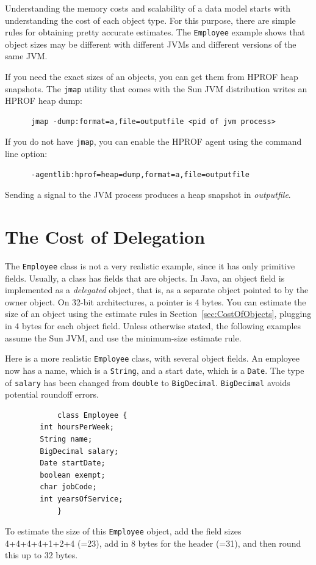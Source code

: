 Understanding the memory costs and scalability of a data model starts with understanding the cost of each object type. For this purpose, there are simple rules for obtaining pretty accurate estimates. The \texttt{Employee} example shows that object sizes may be different with different JVMs and different versions of the same JVM.

If you need the exact sizes of an objects, you can get them from HPROF heap snapshots. The \texttt{jmap} utility that comes with the Sun JVM distribution writes an HPROF heap dump:
\ttfamily
\begin{verbatim} 
      jmap -dump:format=a,file=outputfile <pid of jvm process> 
\end{verbatim}
If you do not have \texttt{jmap}, you can enable the HPROF agent using the command line option: 
\ttfamily
\begin{verbatim} 
      -agentlib:hprof=heap=dump,format=a,file=outputfile
\end{verbatim}
\normalfont
Sending a signal to the JVM process produces a heap snapshot in \textit{outputfile}.


\section{The Cost of Delegation}

The \texttt{Employee} class is not a very realistic example, since it has only primitive fields. Usually, a class has fields that are objects.  In Java, an object field is implemented as a \textit{delegated} object, that is, as a separate object pointed to by the owner object. On 32-bit architectures, a pointer is 4 bytes. You can estimate the size of an object using the estimate rules in Section~\ref{sec:CostOfObjects}, plugging in 4 bytes for each object field. Unless otherwise stated, the following examples assume the Sun JVM, and use the minimum-size estimate rule. 
\begin{example}
Here is a more realistic \texttt{Employee} class, with several object fields. An employee now has a name, which is a \texttt{String}, and a start date, which is a \texttt{Date}. The type of \texttt{salary} has been changed from \texttt{double} to \texttt{BigDecimal}. \texttt{BigDecimal} avoids potential roundoff errors.
\ttfamily
\begin{verbatim} 
			class Employee {
        int hoursPerWeek;
        String name;
        BigDecimal salary;
        Date startDate;
        boolean exempt;
        char jobCode;
        int yearsOfService;
			}
\end{verbatim}
\normalfont
To estimate the size of this \texttt{Employee} object, add the field sizes 4+4+4+4+1+2+4 (=23), add in 8 bytes for the header (=31), and then round this up to 32 bytes. 
\end{example}

